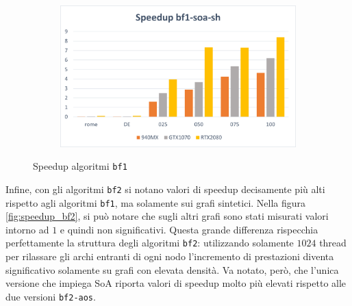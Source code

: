 \documentclass[12pt,a4paper,oneside]{book}
\begin{document}
\begin{figure}[b]
\begin{subfigure}{.5\textwidth}
		\end{subfigure}%
		\begin{subfigure}{.5\textwidth}
			\centering
			\includegraphics[width=\textwidth]{speedup_bf1-soa-sh}
		\end{subfigure}
		\caption{Speedup algoritmi \texttt{bf1}}
		\label{fig:speedup_bf1}
	\end{figure}

	Infine, con gli algoritmi \texttt{bf2} si notano valori di speedup decisamente più alti rispetto agli algoritmi \texttt{bf1}, ma solamente sui grafi sintetici. Nella figura \ref{fig:speedup_bf2}, si può notare che sugli altri grafi sono stati misurati valori intorno ad $1$ e quindi non significativi. Questa grande differenza rispecchia perfettamente la struttura degli algoritmi \texttt{bf2}: utilizzando solamente $1024$ thread per rilassare gli archi entranti di ogni nodo l'incremento di prestazioni diventa significativo solamente su grafi con elevata densità. Va notato, però, che l'unica versione che impiega SoA riporta valori di speedup molto più elevati rispetto alle due versioni \texttt{bf2-aos}.
\end{document}
